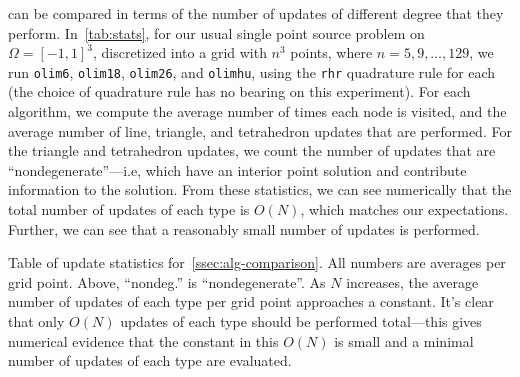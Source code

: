 \documentclass[sisc-eikonal.tex]{subfiles}
\begin{document}
 can be compared in terms of the
number of updates of different degree that they
perform. In~\cref{tab:stats}, for our usual single point source
problem on $\Omega = [-1, 1]^3$, discretized into a grid with $n^3$
points, where $n = 5, 9, \hdots, 129$, we run \texttt{olim6},
\texttt{olim18}, \texttt{olim26}, and \texttt{olimhu}, using the
\texttt{rhr} quadrature rule for each (the choice of quadrature rule
has no bearing on this experiment). For each algorithm, we compute the
average number of times each node is visited, and the average number
of line, triangle, and tetrahedron updates that are performed. For the
triangle and tetrahedron updates, we count the number of updates that
are ``nondegenerate''---i.e, which have an interior point solution and
contribute information to the solution. From these statistics, we can
see numerically that the total number of updates of each type is
$O(N)$, which matches our expectations. Further, we can see that a
reasonably small number of updates is performed.

\begin{table}
  \centering
  
  \caption{Table of update statistics
    for~\cref{ssec:alg-comparison}. All numbers are averages per grid
    point. Above, ``nondeg.'' is ``nondegenerate''. As $N$ increases,
    the average number of updates of each type per grid point
    approaches a constant. It's clear that only $O(N)$ updates of each
    type should be performed total---this gives numerical evidence
    that the constant in this $O(N)$ is small and a minimal number of
    updates of each type are evaluated.}
  \label{tab:stats}
\end{table}
\end{document}
